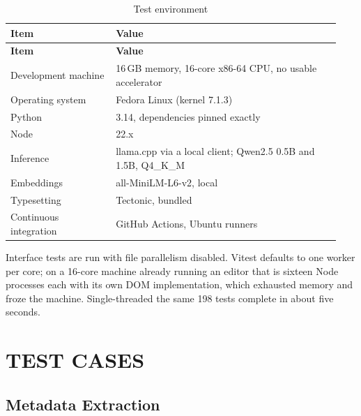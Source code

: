 \documentclass[12pt,a4paper]{report}
\begin{document}
\begin{longtable}{@{}p{0.30\linewidth}p{0.64\linewidth}@{}}
\caption{Test environment}\label{tab:env}\\
\toprule
\textbf{Item} & \textbf{Value} \\
\midrule
\endfirsthead
\toprule
\textbf{Item} & \textbf{Value} \\
\midrule
\endhead

Development machine & 16\,GB memory, 16-core x86-64 CPU, no usable accelerator \\
Operating system & Fedora Linux (kernel 7.1.3) \\
Python & 3.14, dependencies pinned exactly \\
Node & 22.x \\
Inference & llama.cpp via a local client; Qwen2.5 0.5B and 1.5B, Q4\_K\_M \\
Embeddings & all-MiniLM-L6-v2, local \\
Typesetting & Tectonic, bundled \\
Continuous integration & GitHub Actions, Ubuntu runners \\
\bottomrule
\end{longtable}

Interface tests are run with file parallelism disabled. Vitest defaults to one
worker per core; on a 16-core machine already running an editor that is sixteen
Node processes each with its own DOM implementation, which exhausted memory and
froze the machine. Single-threaded the same 198 tests complete in about five
seconds.

\chapter{TEST CASES}

\section{Metadata Extraction}
\end{document}
